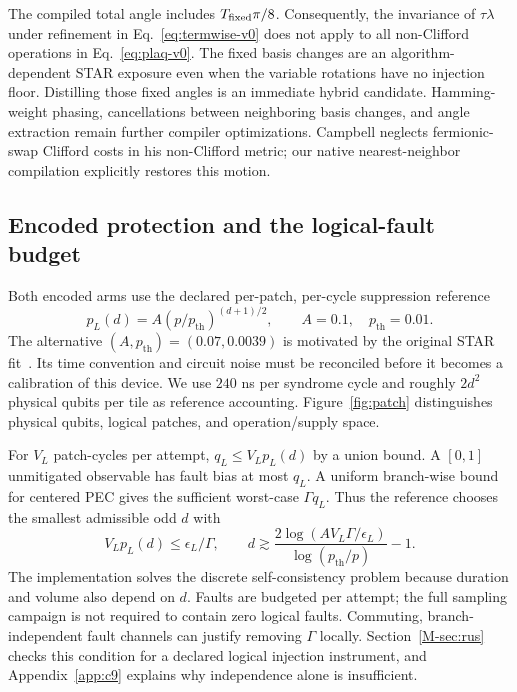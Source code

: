 \documentclass[11pt]{article}
\newcommand{\eps}{\epsilon}
\begin{document}
The compiled total angle includes $T_{\rm fixed}\pi/8$. Consequently, the
invariance of $\tau\lambda$ under refinement in Eq.~\eqref{eq:termwise-v0}
does not apply to all non-Clifford operations in Eq.~\eqref{eq:plaq-v0}.
The fixed basis changes are an algorithm-dependent STAR exposure even when
the variable rotations have no injection floor. Distilling those fixed
angles is an immediate hybrid candidate. Hamming-weight phasing, cancellations
between neighboring basis changes, and angle extraction remain further compiler
optimizations. Campbell neglects fermionic-swap Clifford costs in his
non-Clifford metric; our native nearest-neighbor compilation explicitly restores this motion.



\subsection{Encoded protection and the logical-fault budget}
Both encoded arms use the declared per-patch, per-cycle suppression reference
\begin{equation}\label{eq:logical-v0}
 p_L(d)=A(p/p_{\mathrm{th}})^{(d+1)/2},\qquad
 A=0.1,\quad p_{\mathrm{th}}=0.01.
\end{equation}
The alternative $(A,p_{\mathrm{th}})=(0.07,0.0039)$ is motivated by the
original STAR fit~\cite{akahoshi}. Its time convention and circuit noise
must be reconciled before it becomes a calibration of this device. We use
$240$ ns per syndrome cycle and roughly $2d^2$ physical qubits per tile as
reference accounting. Figure~\ref{fig:patch} distinguishes physical qubits,
logical patches, and operation/supply space.

For $V_L$ patch-cycles per attempt, $q_L\leq V_Lp_L(d)$ by a union bound.
A $[0,1]$ unmitigated observable has fault bias at most $q_L$. A uniform
branch-wise bound for centered PEC gives the sufficient worst-case
$\Gamma q_L$. Thus the reference chooses the smallest admissible odd $d$ with
\begin{equation}\label{eq:distance-v0}
 V_Lp_L(d)\leq\eps_L/\Gamma,\qquad
 d\gtrsim\frac{2\log(AV_L\Gamma/\eps_L)}{\log(p_{\mathrm{th}}/p)}-1.
\end{equation}
The implementation solves the discrete self-consistency problem because
duration and volume also depend on $d$. Faults are budgeted per attempt;
the full sampling campaign is not required to contain zero logical faults.
Commuting, branch-independent fault channels can justify removing $\Gamma$
locally. Section~\ref{M-sec:rus} checks this condition for a declared logical
injection instrument, and Appendix~\ref{app:c9} explains why independence
alone is insufficient.
\end{document}
